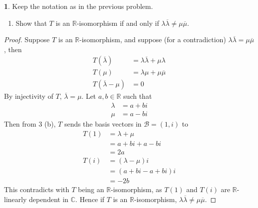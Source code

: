 \documentclass{article}
\theoremstyle{definition}
\newtheorem{problem}{}
\numberwithin{lemma}{problem}
\numberwithin{equation}{problem}
\newcommand{\R}{\mathbb{R}}
\newcommand{\C}{\mathbb{C}}
\newcommand{\B}{\mathcal{B}}
\newcommand{\conj}[1]{\overline{#1}}
\begin{document}
\newpage
\begin{problem}
    Keep the notation as in the previous problem.
    \begin{enumerate}[label=(\alph*)]
        \item Show that $T$ is an $\R$-isomorphism if and only if
            $\lambda \conj{\lambda} \ne \mu\conj{\mu}$.
    \end{enumerate}
\end{problem}
\begin{proof}
    Suppose $T$ is an $\R$-isomorphism, and
    suppose (for a contradiction) $\lambda\conj\lambda = \mu\conj\mu$, then
    \begin{align*}
        T(\conj\lambda) &= \lambda\conj\lambda + \mu\lambda\\
        T(\mu) &= \lambda\mu + \mu\conj\mu \\
        T(\conj\lambda - \mu) &= 0
    \end{align*}
    By injectivity of $T$, $\conj\lambda = \mu$.
    Let $a,b \in \R$ such that
    \begin{align*}
        \lambda &= a + bi    \\
        \mu &= a - bi
    \end{align*}
    Then from 3 (b), $T$ sends the basis vectors in $\B = (1,i)$ to
    \begin{align*}
        T(1) &= \lambda + \mu   \\
        &= a + bi + a - bi      \\
        &= 2a \\
        T(i) &= (\lambda - \mu)i\\
        &= (a + bi - a + bi)i   \\
        &= -2b
    \end{align*}
    This contradicts with $T$ being an $\R$-isomorphism, as $T(1)$ and $T(i)$ are $\R$-linearly dependent in $\C$.
    Hence if $T$ is an $\R$-isomorphism, $\lambda\conj\lambda \ne \mu\conj\mu$.


\end{proof}
\end{document}
